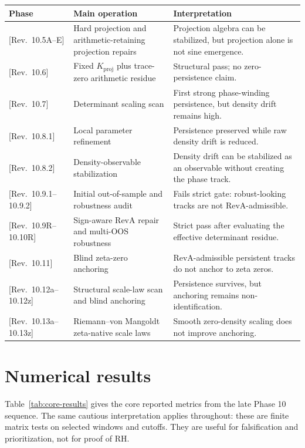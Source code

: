 \documentclass[11pt]{article}
\newcommand{\Kproj}{K_{\mathrm{proj}}}
\newcommand{\revtag}[1]{\textnormal{[Rev.~#1]}}
\theoremstyle{definition}
\theoremstyle{plain}
\begin{document}
\begin{longtable}{p{}p{}p{}}
\toprule
Phase & Main operation & Interpretation \\
\midrule
\revtag{10.5A--E} & Hard projection and arithmetic-retaining projection repairs & Projection algebra can be stabilized, but projection alone is not sine emergence. \\
\revtag{10.6} & Fixed $\Kproj$ plus trace-zero arithmetic residue & Structural pass; no zero-persistence claim. \\
\revtag{10.7} & Determinant scaling scan & First strong phase-winding persistence, but density drift remains high. \\
\revtag{10.8.1} & Local parameter refinement & Persistence preserved while raw density drift is reduced. \\
\revtag{10.8.2} & Density-observable stabilization & Density drift can be stabilized as an observable without creating the phase track. \\
\revtag{10.9.1--10.9.2} & Initial out-of-sample and robustness audit & Fails strict gate: robust-looking tracks are not RevA-admissible. \\
\revtag{10.9R--10.10R} & Sign-aware RevA repair and multi-OOS robustness & Strict pass after evaluating the effective determinant residue. \\
\revtag{10.11} & Blind zeta-zero anchoring & RevA-admissible persistent tracks do not anchor to zeta zeros. \\
\revtag{10.12a--10.12z} & Structural scale-law scan and blind anchoring & Persistence survives, but anchoring remains non-identification. \\
\revtag{10.13a--10.13z} & Riemann--von Mangoldt zeta-native scale laws & Smooth zero-density scaling does not improve anchoring. \\
\bottomrule
\end{longtable}

\section{Numerical results}

Table~\ref{tab:core-results} gives the core reported metrics from the late Phase 10 sequence.  The same cautious interpretation applies throughout: these are finite matrix tests on selected windows and cutoffs.  They are useful for falsification and prioritization, not for proof of RH.
\end{document}
